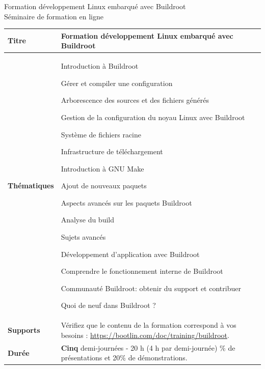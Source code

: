 \documentclass[a4paper,12pt,obeyspaces,spaces,hyphens]{article}
\begin{document}
\setlength{\arrayrulewidth}{0.8pt}

\begin{center}
\LARGE
Formation développement Linux embarqué avec Buildroot\\
\large
Séminaire de formation en ligne
\end{center}
\vspace{1cm}

\small
{}

 {
  \begin{tabularx}{\textwidth}{|g|h|}
    {\bf Titre} & {\bf Formation développement Linux embarqué avec Buildroot} \\
    \hline

    {\bf Thématiques} &
    Introduction à Buildroot \par
    Gérer et compiler une configuration \par
    Arborescence des sources et des fichiers générés \par
    Gestion de la configuration du noyau Linux avec Buildroot \par
    Système de fichiers racine \par
    Infrastructure de téléchargement \par
    Introduction à GNU Make \par
    Ajout de nouveaux paquets \par
    Aspects avancés sur les paquets Buildroot \par
    Analyse du build \par
    Sujets avancés \par
    Développement d’application avec Buildroot \par
    Comprendre le fonctionnement interne de Buildroot \par
    Communauté Buildroot: obtenir du support et contribuer \par
    Quoi de neuf dans Buildroot ? \\
    \hline
    {\bf Supports} &
    Vérifiez que le contenu de la formation correspond à vos besoins :
    \newline \url{https://bootlin.com/doc/training/buildroot}. \\
    \hline

    {\bf Durée} & {\bf Cinq} demi-journées - 20 h (4 h par demi-journée)
    \% de présentations et 20\% de démonstrations. \\
    \hline


\end{tabularx}}
\end{document}
